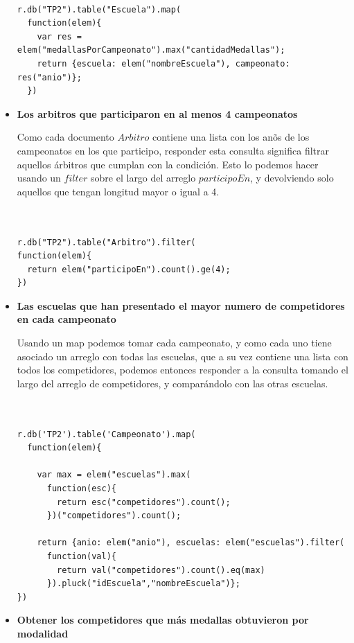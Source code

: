 \begin{itemize}
{\begin{verbatim}

r.db("TP2").table("Escuela").map(
  function(elem){
    var res = elem("medallasPorCampeonato").max("cantidadMedallas");
    return {escuela: elem("nombreEscuela"), campeonato: res("anio")};
  })

\end{verbatim}
}

\item{\textbf{Los arbitros que participaron en al menos 4 campeonatos}

Como cada documento $Arbitro$ contiene una lista con los an\~os de los campeonatos en los que participo, responder esta consulta significa filtrar aquellos árbitros que cumplan con la condición. Esto lo podemos hacer usando un $filter$ sobre el largo del arreglo $participoEn$, y devolviendo solo aquellos que tengan longitud mayor o igual a 4. 

\begin{verbatim}


r.db("TP2").table("Arbitro").filter(
function(elem){
  return elem("participoEn").count().ge(4);
})

\end{verbatim}
}

\item{\textbf{Las escuelas que han presentado el mayor numero de competidores en cada campeonato}

Usando un map podemos tomar cada campeonato, y como cada uno tiene asociado un arreglo con todas las escuelas, que a su vez contiene una lista con todos los competidores, podemos entonces responder a la consulta tomando el largo del arreglo de competidores, y comparándolo con las otras escuelas.

\begin{verbatim}


r.db('TP2').table('Campeonato').map(
  function(elem){

    var max = elem("escuelas").max(
      function(esc){
        return esc("competidores").count();
      })("competidores").count();
    
    return {anio: elem("anio"), escuelas: elem("escuelas").filter(
      function(val){
      	return val("competidores").count().eq(max)
      }).pluck("idEscuela","nombreEscuela")};
})

\end{verbatim}
}


\item{\textbf{Obtener los competidores que m\'as medallas obtuvieron por modalidad}

}
\end{itemize}
